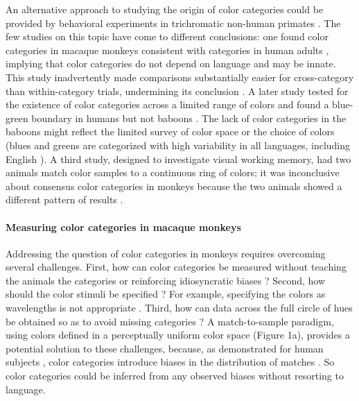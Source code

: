 An alternative approach to studying the origin of color categories could be provided by behavioral experiments in trichromatic non-human primates \citep{RN18699,siuda-krzywicka_biological_2019}. 
The few studies on this topic have come to different conclusions: one found color categories in macaque monkeys consistent with categories in human adults \citep{sandell_color_1979}, implying that color categories do not depend on language and may be innate.
This study inadvertently made comparisons substantially easier for cross-category than within-category trials, undermining its conclusion \citep{davidoff_cross-species_2010}. 
A later study tested for the existence of color categories across a limited range of colors and found a blue-green boundary in humans but not baboons \citep{fagot_cross-species_2006,RN18699}. The lack of color categories in the baboons might reflect the limited survey of color space or the choice of colors (blues and greens are categorized with high variability in all languages, including English \citep{gibson_color_2017}). A third study, designed to investigate visual working memory, had two animals match color samples to a continuous ring of colors; it was inconclusive about consensus color categories in monkeys because the two animals showed a different pattern of results \citep{panichello_error-correcting_2019}.

\paragraph{Measuring color categories in macaque monkeys}

Addressing the question of color categories in monkeys requires overcoming several challenges. First, how can color categories be measured without teaching the animals the categories or reinforcing idiosyncratic biases \citep{essock_color_1977,matsuno_color_2004}? Second, how should the color stimuli be specified \citep{siuda-krzywicka_biological_2019}? For example, specifying the colors as wavelengths \citep{sandell_color_1979} is not appropriate \citep{davidoff_cross-species_2010}. 
Third, how can data across the full circle of hues be obtained so as to avoid missing categories \citep{fagot_cross-species_2006}? A match-to-sample paradigm, using colors defined in a perceptually uniform color space \citep{stockman_colorimetry_2010} (Figure 1a), provides a potential solution to these challenges, because, as demonstrated for human subjects , color categories introduce biases in the distribution of matches \citep{bae_why_2015}. So color categories could be inferred from any observed biases without resorting to language. 

